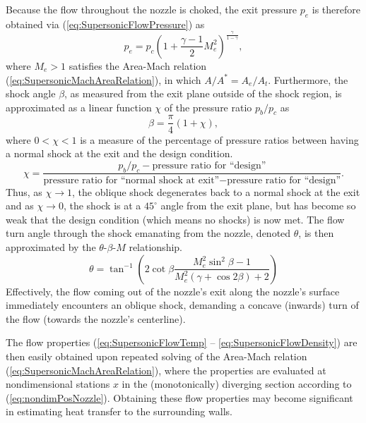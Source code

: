\documentclass[11pt,dvipsnames]{thesis}
\begin{document}
Because the flow throughout the nozzle is choked, the exit pressure $p_e$ is therefore obtained via (\ref{eq:SupersonicFlowPressure}) as
\begin{equation}
p_e = p_c \left(1 + \frac{\gamma - 1}{2} M_e^2\right)^{\frac{\gamma}{1 - \gamma}},
\end{equation}
where $M_e > 1$ satisfies the Area-Mach relation (\ref{eq:SupersonicMachAreaRelation}), in which $A/A^* = A_e/A_t$. 
%
Furthermore, the shock angle $\beta$, as measured from the exit plane outside of the shock region, is approximated as a linear function $\chi$ of the pressure ratio $p_b/p_c$ as
\begin{equation}
\beta = \frac{\pi}{4}(1 + \chi),
\end{equation}
where $0 < \chi < 1$ is a measure of the percentage of pressure ratios between having a normal shock at the exit and the design condition.
\begin{equation}
\chi = \frac{p_b/p_c - \text{pressure ratio for ``design''}}{\text{pressure ratio for ``normal shock at exit''} - \text{pressure ratio for ``design''}}.
\end{equation}
Thus, as $\chi \to 1$, the oblique shock degenerates back to a normal shock at the exit and as $\chi \to 0$, the shock is at a $45^\circ$ angle from the exit plane, but has become so weak that the design condition (which means no shocks) is now met.
The flow turn angle through the shock emanating from the nozzle, denoted $\theta$, is then approximated by the $\theta$-$\beta$-$M$ relationship.
\begin{equation}
\theta = \tan^{-1}\left(2 \cot\beta \frac{M_e^2 \sin^2\beta - 1}{M_e^2 (\gamma + \cos 2\beta) + 2} \right)
\end{equation}
Effectively, the flow coming out of the nozzle's exit along the nozzle's surface immediately encounters an oblique shock, demanding a concave (inwards) turn of the flow (towards the nozzle's centerline).

The flow properties (\ref{eq:SupersonicFlowTemp} -- \ref{eq:SupersonicFlowDensity}) are then easily obtained upon repeated solving of the Area-Mach relation (\ref{eq:SupersonicMachAreaRelation}), where the properties are evaluated at nondimensional stations $x$ in the (monotonically) diverging section according to (\ref{eq:nondimPosNozzle}). 
Obtaining these flow properties may become significant in estimating heat transfer to the surrounding walls.
\end{document}
